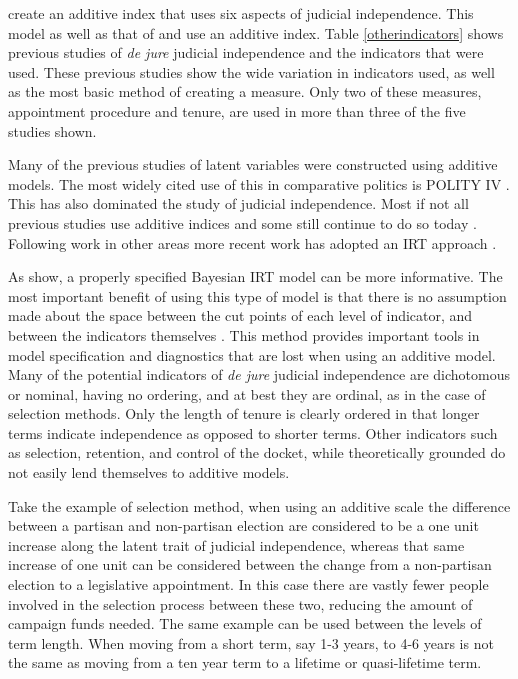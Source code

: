 \documentclass[12pt]{article}
\begin{document}
\doublespacing\normalsize
\citet*{Melton2014} create an additive index that uses six aspects of judicial independence.  This model as well as that of \citet*{Feld2003} and \citet*{Keith2002b} use an additive index.  Table \ref{otherindicators} shows previous studies of \textit{de jure} judicial independence and the indicators that were used.  These previous studies show the wide variation in indicators used, as well as the most basic method of creating a measure.  Only two of these measures, appointment procedure and tenure, are used in more than three of the five studies shown.

Many of the previous studies of latent variables were constructed using additive models.  The most widely cited use of this in comparative politics is POLITY IV \citep{Polity}.  This has also dominated the study of judicial independence.  Most if not all previous studies use additive indices \citep{Feld2003,Keith2002a,Laporta2004} and some still continue to do so today \citep{Melton2014}.  Following work in other areas more recent work has adopted an IRT approach \citep{Martin2002,Treier2008,Schnakenberg2014,Linzer2014,Fariss2014}.

As \citet{Linzer2014} show, a  properly specified Bayesian IRT model can be more informative.  The most important benefit of using this type of model is that there is no assumption made about the space between the cut points of each level of indicator, and between the indicators themselves \citep{Jackman2008,Schnakenberg2014}.  This method provides important tools in model specification and diagnostics that are lost when using an additive model.  Many of the potential indicators of \textit{de jure} judicial independence are dichotomous or nominal, having no ordering, and at best they are ordinal, as in the case of selection methods.  Only the length of tenure is clearly ordered in that longer terms indicate independence as opposed to shorter terms.  Other indicators such as selection, retention, and control of the docket, while theoretically grounded do not easily lend themselves to additive models.

Take the example of selection method, when using an additive scale the difference between a partisan and non-partisan election are considered to be a one unit increase along the latent trait of judicial independence, whereas that same increase of one unit can be considered between the change from a non-partisan election to a legislative appointment.  In this case there are vastly fewer people involved in the selection process between these two, reducing the amount of campaign funds needed.  The same example can be used between the levels of term length.  When moving from a short term, say 1-3 years, to 4-6 years is not the same as moving from a ten year term to a lifetime or quasi-lifetime term.
\end{document}
